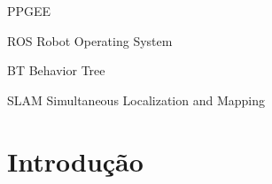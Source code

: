 \documentclass[repeatfields,xlists,xpacks,oneside,yearsonly]{ufrgscca}
\begin{document}
\maketitle




\begin{abstract}

\end{abstract}



\setcounter{tocdepth}{3}

\listoffigures

\listoftables
\listofcodelist %

\begin{listofabbrv}{PPGEE}
    \item[ROS] Robot Operating System
    \item[BT] Behavior Tree
    \item[SLAM] Simultaneous Localization and Mapping
\end{listofabbrv}


\tableofcontents

\chapter{Introdução}
\end{document}
